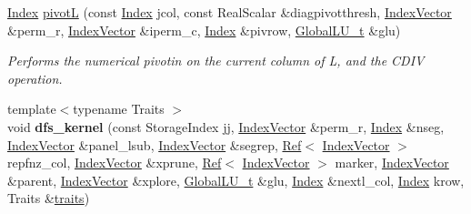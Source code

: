 \begin{DoxyCompactItemize}
\item 
\hyperlink{namespace_eigen_a62e77e0933482dafde8fe197d9a2cfde}{Index} \hyperlink{group___sparse_l_u___module_ab5f56947465b829f8d523575724c3ac6}{pivotL} (const \hyperlink{namespace_eigen_a62e77e0933482dafde8fe197d9a2cfde}{Index} jcol, const Real\+Scalar \&diagpivotthresh, \hyperlink{group___core___module}{Index\+Vector} \&perm\+\_\+r, \hyperlink{group___core___module}{Index\+Vector} \&iperm\+\_\+c, \hyperlink{namespace_eigen_a62e77e0933482dafde8fe197d9a2cfde}{Index} \&pivrow, \hyperlink{struct_eigen_1_1internal_1_1_l_u___global_l_u__t}{Global\+L\+U\+\_\+t} \&glu)
\begin{DoxyCompactList}\small\item\em Performs the numerical pivotin on the current column of L, and the C\+D\+IV operation. \end{DoxyCompactList}\item 
\mbox{\label{group___sparse_l_u___module_aef49b896c596d9e4893d3ae468d1dfac}} 
{\footnotesize template$<$typename Traits $>$ }\\void {\bfseries dfs\+\_\+kernel} (const Storage\+Index jj, \hyperlink{group___core___module}{Index\+Vector} \&perm\+\_\+r, \hyperlink{namespace_eigen_a62e77e0933482dafde8fe197d9a2cfde}{Index} \&nseg, \hyperlink{group___core___module}{Index\+Vector} \&panel\+\_\+lsub, \hyperlink{group___core___module}{Index\+Vector} \&segrep, \hyperlink{group___core___module_class_eigen_1_1_ref}{Ref}$<$ \hyperlink{group___core___module}{Index\+Vector} $>$ repfnz\+\_\+col, \hyperlink{group___core___module}{Index\+Vector} \&xprune, \hyperlink{group___core___module_class_eigen_1_1_ref}{Ref}$<$ \hyperlink{group___core___module}{Index\+Vector} $>$ marker, \hyperlink{group___core___module}{Index\+Vector} \&parent, \hyperlink{group___core___module}{Index\+Vector} \&xplore, \hyperlink{struct_eigen_1_1internal_1_1_l_u___global_l_u__t}{Global\+L\+U\+\_\+t} \&glu, \hyperlink{namespace_eigen_a62e77e0933482dafde8fe197d9a2cfde}{Index} \&nextl\+\_\+col, \hyperlink{namespace_eigen_a62e77e0933482dafde8fe197d9a2cfde}{Index} krow, Traits \&\hyperlink{struct_eigen_1_1internal_1_1traits}{traits})
\item 

\end{DoxyCompactItemize}
